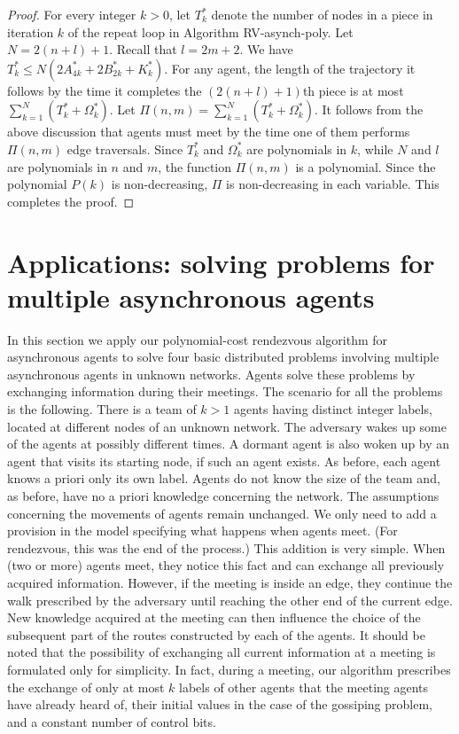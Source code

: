 \documentclass [11pt] {article}
\begin{document}
\begin{proof}
For every integer $k>0$, let $T^*_k$ denote the number of nodes in a piece in iteration $k$ of the repeat loop in Algorithm RV-asynch-poly. Let $N=2(n+l)+1$. Recall that $l=2m+2$. 
 We have $T_k^* \le  N(2A_{4k}^* + 2B_{2k}^* + K_k^*)$.
 {For any agent, the length of the trajectory it follows by the time it
 completes the $(2(n+l)+1)$th piece is at most $\sum_{k=1}^N(T^*_k+\Omega^*_k)$.} Let $\Pi(n,m)=\sum_{k=1}^N(T^*_k+\Omega^*_k)$.
It follows from the above discussion that agents must meet by the time one of them performs $\Pi(n,m)$ edge traversals.
 Since $T^*_k$ and $\Omega^*_k$ are polynomials in $k$, while $N$ and $l$ are polynomials in $n$ and $m$, the function $\Pi(n,m)$ is a polynomial.
Since the polynomial $P(k)$ is non-decreasing, $\Pi$ is non-decreasing in each variable. This completes the proof.
\end{proof}

\section{Applications: solving problems for multiple asynchronous agents}

In this section we apply our polynomial-cost rendezvous algorithm for asynchronous agents to solve four basic distributed problems
involving multiple asynchronous agents in unknown networks. Agents solve these problems by exchanging information during their meetings.
The scenario for all the problems is the following. There is a team of $k>1$ agents having distinct integer labels, located at different nodes of an unknown network. 
The adversary wakes up some of the agents at possibly different times. A dormant agent is also woken up by an agent that visits its starting node, if such an agent exists.
As before, each agent knows a priori only its own label. Agents do not know the size of the team and, as before, have no
a priori knowledge concerning the network.
The assumptions concerning the movements of agents remain unchanged. We only need to add a provision in the model specifying what happens when agents meet. (For rendezvous, this was the end of the process.) This addition is very simple. 
When (two or more)  agents meet, they notice this fact and can exchange all previously acquired information. 
However, if the meeting is inside an edge,
they continue the walk prescribed by the adversary until reaching the other end of the current edge. New knowledge acquired at the meeting
can then influence the choice of the subsequent part of the routes constructed by each of the agents. It should be noted that the possibility
of exchanging all current information at a meeting is formulated only for simplicity. In fact, during a meeting, our algorithm prescribes the exchange of only at most
$k$ labels of other agents that the meeting agents have already heard of, their initial values in the case of the gossiping problem, and a constant number of control bits.
\end{document}
